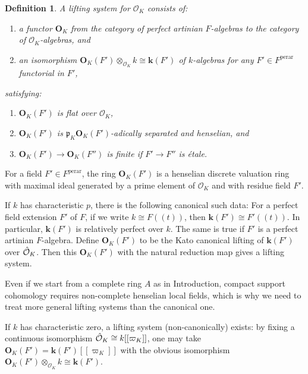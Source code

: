 \documentclass{amsart}
\newtheorem{Def}[Thm]{Definition}
\theoremstyle{remark}
\numberwithin{equation}{subsection}
\newcommand{\Order}{\mathcal{O}}
\newcommand{\tensor}{\mathbin{\otimes}}
\newcommand{\perar}{\mathrm{perar}}
\newcommand{\alg}[1]{\mathbf{#1}}
\newcommand{\ideal}[1]{\mathfrak{#1}}
\begin{document}
\begin{Def} \label{0038}
	A \emph{lifting system} for $\Order_{K}$ consists of:
	\begin{enumerate}
		\item \label{0170}
			a functor $\alg{O}_{K}$ from the category of perfect artinian $F$-algebras
			to the category of $\Order_{K}$-algebras, and
		\item \label{0171}
			an isomorphism $\alg{O}_{K}(F') \tensor_{\Order_{K}} k \cong \alg{k}(F')$
			of $k$-algebras for any $F' \in F^{\perar}$ functorial in $F'$,
	\end{enumerate}
	satisfying:
	\begin{enumerate}
		\item
			$\alg{O}_{K}(F')$ is flat over $\Order_{K}$,
		\item
			$\alg{O}_{K}(F')$ is $\ideal{p}_{K} \alg{O}_{K}(F')$-adically separated and henselian, and
		\item
			$\alg{O}_{K}(F') \to \alg{O}_{K}(F'')$ is finite
			if $F' \to F''$ is \'etale.
	\end{enumerate}
\end{Def}

For a field $F' \in F^{\perar}$,
the ring $\alg{O}_{K}(F')$ is a henselian discrete valuation ring
with maximal ideal generated by a prime element of $\Order_{K}$
and with residue field $F'$.

If $k$ has characteristic $p$,
there is the following canonical such data:
For a perfect field extension $F'$ of $F$,
if we write $k \cong F((t))$, then $\alg{k}(F') \cong F'((t))$.
In particular, $\alg{k}(F')$ is relatively perfect over $k$.
The same is true if $F'$ is a perfect artinian $F$-algebra.
Define $\alg{O}_{K}(F')$ to be the Kato canonical lifting of $\alg{k}(F')$ over $\Hat{\Order}_{K}$.
Then this $\alg{O}_{K}(F')$ with the natural reduction map gives a lifting system.

Even if we start from a complete ring $A$ as in Introduction,
compact support cohomology requires non-complete henselian local fields,
which is why we need to treat more general lifting systems than the canonical one.

If $k$ has characteristic zero,
a lifting system (non-canonically) exists:
by fixing a continuous isomorphism $\Hat{\Order}_{K} \cong k[[\varpi_{K}]]$,
one may take $\alg{O}_{K}(F') = \alg{k}(F')[[\varpi_{K}]]$ with the obvious isomorphism
$\alg{O}_{K}(F') \tensor_{\Order_{K}} k \cong \alg{k}(F')$.
\end{document}
